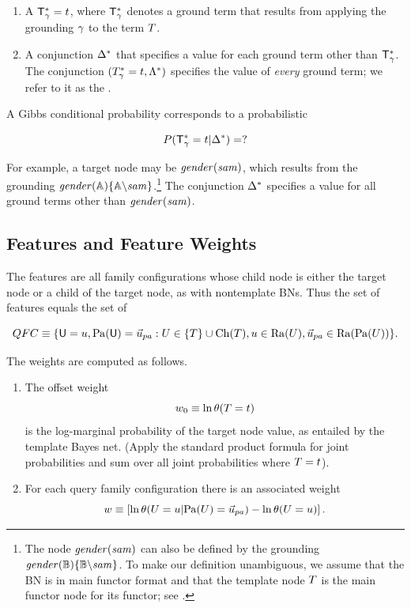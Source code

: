\documentclass[twoside,11pt]{article}
\begin{document}
\begin{enumerate}
\item A  $\mathsf{T}_\gamma^{*}\hspace{0.0ex} = t$, where $\mathsf{T}_\gamma^{*}\hspace{0.0ex}$ denotes a ground term that results from applying the grounding $\gamma$ to the term $T$.
\item A conjunction $\Delta^{*}\hspace{0.0ex}$ that specifies a value for each ground term other than $\mathsf{T}_\gamma^{*}\hspace{0.0ex}$. The conjunction $(T_{\gamma}^{*}\hspace{0.0ex} = t, \Lambda^{*}\hspace{0.0ex})$ specifies the value of {\em every} ground term; we refer to it as the .
\end{enumerate}

A Gibbs conditional probability corresponds to a probabilistic 

$$P(\mathsf{T}_\gamma^{*}\hspace{0.0ex} = t | \Delta^{*}\hspace{0.0ex}) = ?$$

\noindent For example, a target node may be $\it{gender}(sam)$, which results from the grounding $\it{gender}(\mathbb{A})\{\mathbb{A}\backslash sam\}$.\footnote{The node $\it{gender}(sam)$ can also be defined by the grounding $\it{gender}(\mathbb{B})\{\mathbb{B}\backslash sam\}$. To make our definition unambiguous, we assume that the BN is in main functor format and that the template node $T$ is the main functor node for its functor; see \cite{Schulte2012a}.}  The conjunction $\Delta^{*}\hspace{0.0ex}$ specifies a value for all ground terms other than $\it{gender}(sam)$.

\subsection{Features and Feature Weights} \label{sec:features} The features are all family configurations whose child node is either the target node or a child of the target node, as with nontemplate BNs. Thus the set of features equals the set of 

$$\QFC \equiv \{\Appendterm{\UI  = \UV} {\Pa{\UI} = \Prange{\UT}}: \UT \in \{\TT\} \cup \Ch{\TT}, \UV \in \Range{\UT}, \Prange{\UT} \in  \Range{\Pa{\UT}}\}.$$

The weights are computed as follows.

\begin{enumerate}
\item The offset weight $$w_{0} \equiv \ln \theta(T = t)$$ is the log-marginal probability of the target node value, as entailed by the template Bayes net. (Apply the standard product formula for joint probabilities and sum over all joint probabilities where  $T = t$). 
\item For each query family configuration 
there is an associated weight $$w \equiv \left[ \ln \cprob{\UT = \UV}{\Pa{\UT} = \Prange{\UT}} - \ln \jprob{\UT = \UV} \right].$$ 
\end{enumerate}
\end{document}
